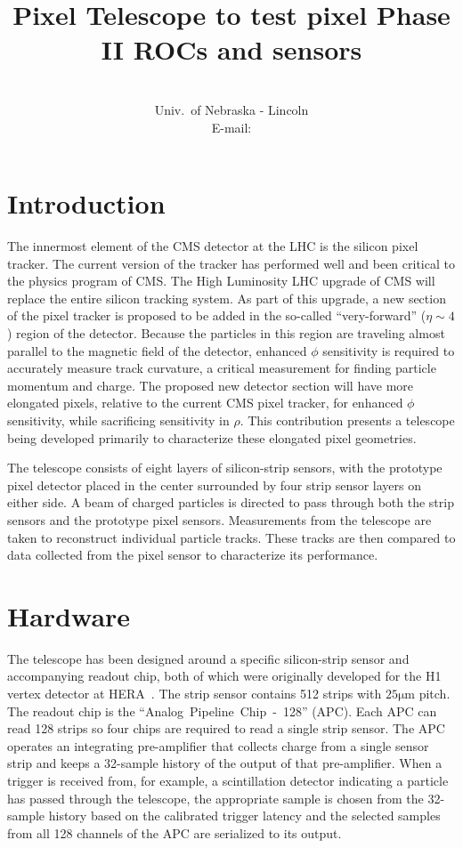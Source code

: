 \documentclass{PoS}
\title{Pixel Telescope to test pixel Phase II ROCs and sensors}
\author{\speaker{Caleb Fangmeier}\\
  Univ.\ of Nebraska \-- Lincoln\\
  E-mail: \email{cfangmei@cern.ch}}
\newcommand{\micron}{\si{\micro\meter}}
\begin{document}
\section{Introduction}

The innermost element of the CMS detector at the LHC is the silicon pixel
tracker. The current version of the tracker has performed well and been
critical to the physics program of CMS. The High Luminosity LHC upgrade of CMS
will replace the entire silicon tracking system.  As part of this upgrade, a
new section of the pixel tracker is proposed to be added in the so-called
``very-forward'' ($\eta\sim4$) region of the detector. Because the particles in
this region are traveling almost parallel to the magnetic field of the
detector, enhanced $\phi$ sensitivity is required to accurately measure track
curvature, a critical measurement for finding particle momentum and charge.
The proposed new detector section will have more elongated pixels, relative to
the current CMS pixel tracker, for enhanced $\phi$ sensitivity, while
sacrificing sensitivity in $\rho$.  This contribution presents a telescope
being developed primarily to characterize these elongated pixel geometries.

The telescope consists of eight layers of silicon-strip sensors, with the
prototype pixel detector placed in the center surrounded by four strip sensor
layers on either side. A beam of charged particles is directed to pass through
both the strip sensors and the prototype pixel sensors.  Measurements from the
telescope are taken to reconstruct individual particle tracks. These tracks are
then compared to data collected from the pixel sensor to characterize its
performance.

\section{Hardware}
The telescope has been designed around a specific silicon-strip sensor and
accompanying readout chip, both of which were originally developed for the H1
vertex detector at HERA~\cite{Hilgers2001}. The strip sensor contains 512
strips with $25\micron$ pitch. The readout chip is the
``Analog~Pipeline~Chip~\--~128'' (APC).  Each APC can read 128 strips so four
chips are required to read a single strip sensor. The APC operates an
integrating pre-amplifier that collects charge from a single sensor strip and
keeps a 32-sample history of the output of that pre-amplifier. When a trigger
is received from, for example, a scintillation detector indicating a particle
has passed through the telescope, the appropriate sample is chosen from the
32-sample history based on the calibrated trigger latency and the selected
samples from all 128 channels of the APC are serialized to its output.
\end{document}

